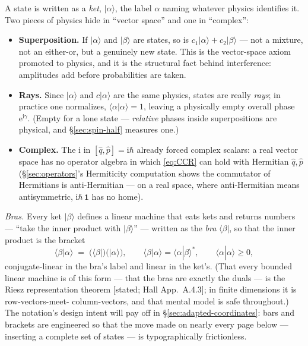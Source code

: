 \documentclass[11pt]{article}
\theoremstyle{plain}
\theoremstyle{definition}
\theoremstyle{remark}
\newcommand{\ee}{\mathrm{e}}
\newcommand{\ii}{\mathrm{i}}
\newcommand{\op}[1]{\hat{#1}}
\newcommand{\idop}{\mathbf{1}}  %
\newcommand{\ket}[1]{\lvert #1 \rangle}
\newcommand{\bra}[1]{\langle #1 \rvert}
\newcommand{\braket}[2]{\langle #1 | #2 \rangle}
\begin{document}
\noindent
A state is written as a \emph{ket}, $\ket\alpha$, the label $\alpha$
naming whatever physics identifies it. Two pieces of physics hide in
``vector space'' and one in ``complex'':
\begin{itemize}
  \item \textbf{Superposition.} If $\ket\alpha$ and $\ket\beta$ are
  states, so is $c_1\ket\alpha + c_2\ket\beta$ --- not a mixture, not
  an either-or, but a genuinely new state. This is the vector-space
  axiom promoted to physics, and it is the structural fact behind
  interference: amplitudes add before probabilities are taken.
  \item \textbf{Rays.} Since $\ket\alpha$ and $c\ket\alpha$ are the
  same physics, states are really \emph{rays}; in practice one
  normalizes, $\braket\alpha\alpha = 1$, leaving a physically empty
  overall phase $\ee^{\ii\gamma}$. (Empty for a lone state ---
  \emph{relative} phases inside superpositions are physical, and
  \S\ref{sec:spin-half} measures one.)
  \item \textbf{Complex.} The $\ii$ in $[\op q, \op p] = \ii\hbar$
  already forced complex scalars: a real vector space has no operator
  algebra in which \eqref{eq:CCR} can hold with Hermitian $\op q,
  \op p$ (\S\ref{sec:operators}'s Hermiticity computation shows the
  commutator of Hermitians is anti-Hermitian --- on a real space,
  where anti-Hermitian means antisymmetric, $\ii\hbar\,\idop$ has no
  home).
\end{itemize}

\emph{Bras.} Every ket $\ket\beta$ defines a linear machine that eats
kets and returns numbers --- ``take the inner product with
$\ket\beta$'' --- written as the \emph{bra} $\bra\beta$, so that the
inner product is the bracket
\begin{equation}
  \braket\beta\alpha
  \;=\; \bigl(\bra\beta\bigr)\bigl(\ket\alpha\bigr),
  \qquad
  \braket\beta\alpha = \braket\alpha\beta^{*},
  \qquad
  \braket\alpha\alpha \ge 0 ,
\end{equation}
conjugate-linear in the bra's label and linear in the ket's. (That
every bounded linear machine is of this form --- that the bras
are exactly the duals --- is the Riesz representation theorem
[stated; Hall App.\ A.4.3]; in finite dimensions it is row-vectors-meet-%
column-vectors, and that mental model is safe throughout.) The
notation's design intent will pay off in
\S\ref{sec:adapted-coordinates}: bars and brackets are engineered so
that the move made on nearly every page below --- inserting a
complete set of states --- is typographically frictionless.
\end{document}
